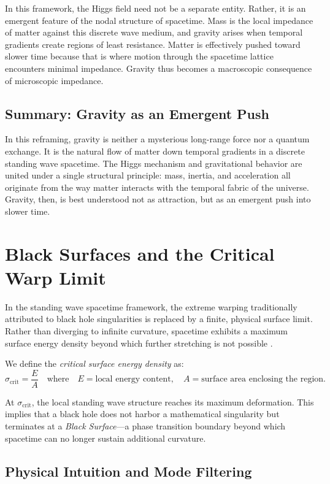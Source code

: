 \documentclass[12pt]{article}
\begin{document}
In this framework, the Higgs field need not be a separate entity. Rather, it is an emergent feature of the nodal structure of spacetime. Mass is the local impedance of matter against this discrete wave medium, and gravity arises when temporal gradients create regions of least resistance. Matter is effectively pushed toward slower time because that is where motion through the spacetime lattice encounters minimal impedance. Gravity thus becomes a macroscopic consequence of microscopic impedance.

\subsection{Summary: Gravity as an Emergent Push}

In this reframing, gravity is neither a mysterious long-range force nor a quantum exchange. It is the natural flow of matter down temporal gradients in a discrete standing wave spacetime. The Higgs mechanism and gravitational behavior are united under a single structural principle: mass, inertia, and acceleration all originate from the way matter interacts with the temporal fabric of the universe. Gravity, then, is best understood not as attraction, but as an emergent push into slower time.


\section{Black Surfaces and the Critical Warp Limit}

In the standing wave spacetime framework, the extreme warping traditionally attributed to black hole singularities is replaced by a finite, physical surface limit. Rather than diverging to infinite curvature, spacetime exhibits a maximum surface energy density beyond which further stretching is not possible \cite{penrose1965, hawking1970}.

We define the \emph{critical surface energy density} as:
\[
\sigma_{\text{crit}} = \frac{E}{A}
\quad
\text{where}
\quad
E = \text{local energy content},
\quad
A = \text{surface area enclosing the region}.
\]

At $\sigma_{\text{crit}}$, the local standing wave structure reaches its maximum deformation. This implies that a black hole does not harbor a mathematical singularity but terminates at a \emph{Black Surface}---a phase transition boundary beyond which spacetime can no longer sustain additional curvature.

\subsection{Physical Intuition and Mode Filtering}
\end{document}
